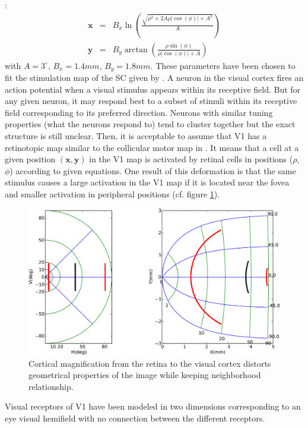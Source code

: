 \cite{Ottes:1986}:
\begin{eqnarray}
  \mathbf{x} &=& B_x \ln{(\frac{\sqrt{\rho^{2}+2A\rho|\cos{(\phi)}|+A^{2}}}{A})}\\
  \mathbf{y} &=& B_y \arctan{(\frac{\rho \sin{(\phi)}}{\rho|\cos{(\phi)}|+A})}
  \label{eq:magnification}
\end{eqnarray}
with $A=3^\circ$, $B_x=1.4mm$, $B_y=1.8mm$. These parameters have been chosen
to fit the stimulation map of the SC given by \cite{Robinson:1972}.  A neuron
in the visual cortex fires an action potential when a visual stimulus appears
within its receptive field. But for any given neuron, it may respond best to a
subset of stimuli within its receptive field corresponding to its preferred
direction. Neurons with similar tuning properties (what the neurons respond to)
tend to cluster together but the exact structure is still unclear. Then, it is
acceptable to assume that V1 has a retinotopic map similar to the collicular
motor map in \cite{Bear:1996}. It means that a cell at a given position
$(\mathbf{x},\mathbf{y})$ in the V1 map is activated by retinal cells in
positions ($\rho$, $\phi$) according to given equations. One result of this
deformation is that the same stimulus causes a large activation in the V1 map
if it is located near the fovea and smaller activation in peripheral positions
(cf. figure \ref{fig:magnification}).
\begin{figure}[htbp!]
  \centering
    \includegraphics[width=\textwidth]{Chapitres/PublicationsSample/Chapitre/figures/mapping}
  \caption{Cortical magnification from the retina to the visual cortex distorts
    geometrical properties of the image while keeping neighborhood
    relationship.}
  \label{fig:magnification}
\end{figure}
Visual receptors of V1 have been modeled in two dimensions corresponding to an
eye visual hemifield with no connection between the different receptors.

